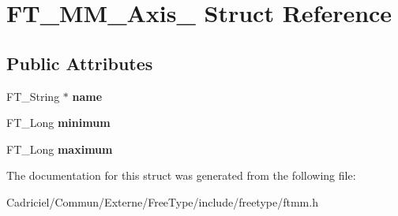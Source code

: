 \hypertarget{struct_f_t___m_m___axis__}{}\section{F\+T\+\_\+\+M\+M\+\_\+\+Axis\+\_\+ Struct Reference}
\label{struct_f_t___m_m___axis__}
\subsection*{Public Attributes}
\begin{DoxyCompactItemize}
\item 
F\+T\+\_\+\+String $\ast$ {\bfseries name}\hypertarget{struct_f_t___m_m___axis___a5c784efa44906c0e2b715eb1f866a09f}{}\label{struct_f_t___m_m___axis___a5c784efa44906c0e2b715eb1f866a09f}

\item 
F\+T\+\_\+\+Long {\bfseries minimum}\hypertarget{struct_f_t___m_m___axis___a9dc31f02b350b1356e0896673b5b73a4}{}\label{struct_f_t___m_m___axis___a9dc31f02b350b1356e0896673b5b73a4}

\item 
F\+T\+\_\+\+Long {\bfseries maximum}\hypertarget{struct_f_t___m_m___axis___addac1f8e71da1bedea9b393ae2751881}{}\label{struct_f_t___m_m___axis___addac1f8e71da1bedea9b393ae2751881}

\end{DoxyCompactItemize}


The documentation for this struct was generated from the following file\+:\begin{DoxyCompactItemize}
\item 
Cadriciel/\+Commun/\+Externe/\+Free\+Type/include/freetype/ftmm.\+h\end{DoxyCompactItemize}

